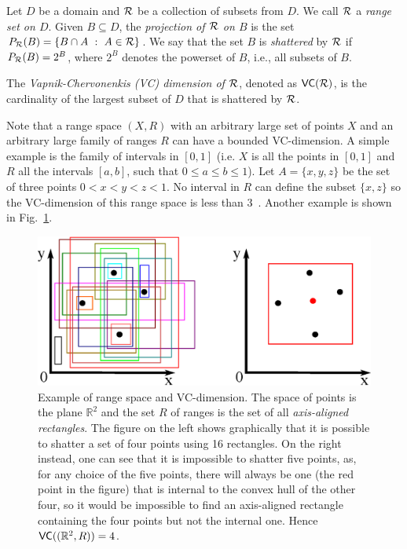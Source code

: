Let $D$ be a domain and $\mathcal{R}$ be a collection of subsets from $D$. We call
$\mathcal{R}$ a \emph{range set on $D$}.
Given $B\subseteq D$, the \emph{projection of $\mathcal{R}$ on $B$} is the set 
$P_{\mathcal{R}}(B)=\{ B\cap A ~:~ A\in\mathcal{R}\}$. We say that the set $B$ is
\emph{shattered} by $\mathcal{R}$ if $P_{\mathcal{R}}(B)=2^B$, where $2^B$ denotes the
powerset of $B$, i.e., all subsets of $B$.

\begin{definition}\label{def:vcdim}
  The \emph{Vapnik-Chervonenkis (VC) dimension of $\mathcal{R}$}, denoted as
  $\mathsf{VC}(\mathcal{R})$, is the cardinality of the largest subset of $D$ that is
  shattered by $\mathcal{R}$.
\end{definition}

\ifproof
Note that a range space $(X,R)$ with an arbitrary large set of points $X$ and
an arbitrary large family of ranges $R$ can have a bounded VC-dimension. A simple
example is the family of intervals in $[0,1]$ (i.e. $X$ is all the points in
$[0,1]$ and $R$ all the intervals $[a,b]$, such that $0\leq a\leq b\leq 1$). Let
$A=\{x,y,z\}$ be the set of three points $0<x<y<z<1$. No interval in $R$ can
define the subset $\{x,z\}$ so the VC-dimension of this range space is less than
3~\citep[Lemma 10.3.1]{Matousek02}. Another example is shown in
Fig.~\ref{fig:rectangles}.
\begin{figure}[ht]
  \centering
  \includegraphics[width=.7\textwidth,keepaspectratio]{figures/rectangles}
  \caption{Example of range space and VC-dimension. The space of points is the
  plane $\mathbb{R}^2$ and the set $R$ of ranges is the set of all
  \emph{axis-aligned rectangles}. The figure on the left shows graphically that
  it is possible to shatter a set of four points using 16 rectangles. On the
  right instead, one can see that it is impossible to shatter five points, as,
  for any choice of the five points, there will always be one (the red point in
  the figure) that is internal to the convex hull of the other four, so it would
  be impossible to find an axis-aligned rectangle containing the four points
  but not the internal one. Hence $\mathsf{VC}((\mathbb{R}^2,R))=4$.}
  \label{fig:rectangles}
\end{figure}
\fi


